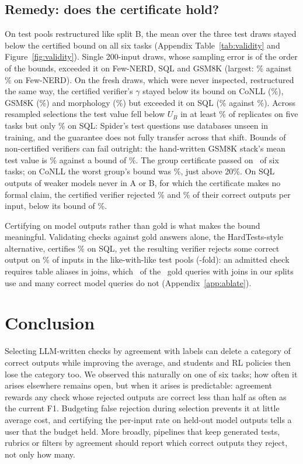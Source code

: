 \documentclass[11pt]{article}
\newcommand{\UB}{U_{\!B}}
\begin{document}
\subsection{Remedy: does the certificate hold?}\label{sec:validity}
On test pools restructured like split B, the mean over the three test
draws stayed below the certified bound on all six tasks
(Appendix Table~\ref{tab:validity} and Figure~\ref{fig:validity}). Single 200-input draws, whose sampling
error is of the order of the bounds, exceeded it on Few-NERD, SQL and
GSM8K (largest: \valMaxCertFewnerd\% against \valUCertFewnerd\% on
Few-NERD). On the fresh draws, which were never inspected, restructured
the same way, the certified verifier's $\gamma$ stayed below its bound on
CoNLL (\rtFreshIE\%), GSM8K (\rtFreshMath\%) and morphology
(\rtFreshMorph\%) but exceeded it on SQL (\rtFreshSQL\% against
\boundBSQL\%). Across resampled selections the test value fell below
$\UB$ in at least \covCertMath\% of replicates on five tasks but only
\covCertSQL\% on SQL: Spider's test questions use databases unseen in
training, and the guarantee does not fully transfer across that shift.
Bounds of non-certified verifiers can fail outright: the hand-written
GSM8K stack's mean test value is \valMeanHwMath\% against a bound of
\valUHwMath\%. The group certificate passed on \rtGroupCertN\ of six tasks;
on CoNLL the worst group's bound was \rtGroupUIE\%, just above 20\%. On SQL outputs of
weaker models never in A or B, for which the certificate makes no formal
claim, the certified verifier rejected \wkDltCertSQLLlamaeight\% and
\wkDltCertSQLQwenseven\% of their correct outputs per input, below its
bound of \wkBoundSQL\%.

Certifying on model outputs rather than gold is what makes the bound
meaningful. Validating checks against gold answers alone, the
HardTests-style alternative, certifies \ablGoldClaimSQL\% on SQL, yet the
resulting verifier rejects some correct output on \rtGoldOnlyTestGammaSQL\%
of inputs in the like-with-like test pools (\rtGoldOnlyRatioSQL-fold): an
admitted check requires table aliases in joins, which \sqlJoinAlias\ of the
\sqlJoinN\ gold queries with joins in our splits use and many correct model
queries do not
(Appendix~\ref{app:ablate}).

\section{Conclusion}
Selecting LLM-written checks by agreement with labels can delete a category
of correct outputs while improving the average, and students and RL
policies then lose the category too. We observed this naturally on one of
six tasks; how often it arises elsewhere remains open, but when it arises
is predictable: agreement rewards any check whose rejected outputs are correct
less than half as often as the current F1. Budgeting false rejection during
selection prevents it at little average cost, and certifying the per-input
rate on held-out model outputs tells a user that the budget held. More
broadly, pipelines that keep generated tests, rubrics or filters by
agreement should report which correct outputs they reject, not only how
many.
\end{document}
